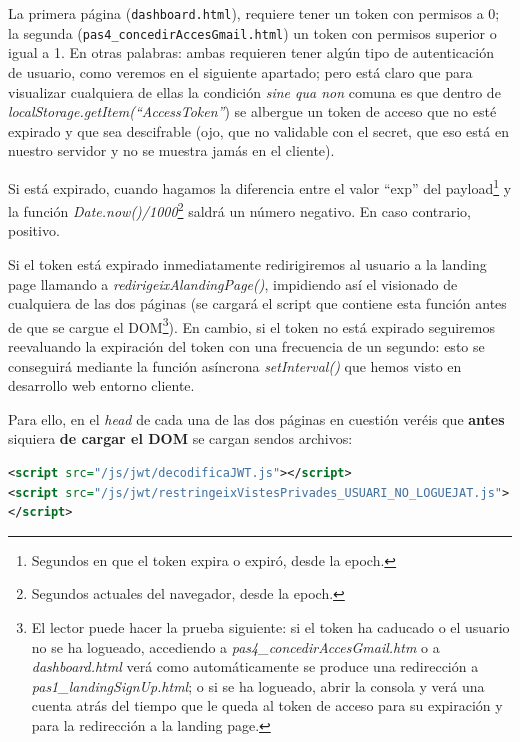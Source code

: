 \documentclass[a4paper,12pt]{report}
\begin{document}
	La primera página (\texttt{dashboard.html}), requiere tener un token con permisos a 0; la segunda (\texttt{pas4\_concedirAccesGmail.html}) un token con permisos superior o igual a 1. En otras palabras: ambas requieren tener algún tipo de autenticación de usuario, como veremos en el siguiente apartado; pero está claro que para visualizar cualquiera de ellas la condición \textit{sine qua non} comuna es que dentro de \textit{localStorage.getItem(``AccessToken''}) se albergue un token de acceso que no esté expirado y que sea descifrable (ojo, que no validable con el secret, que eso está en nuestro servidor y no se muestra jamás en el cliente).
	
	Si está expirado, cuando hagamos la diferencia entre el valor ``exp'' del payload\footnote{Segundos en que el token expira o expiró, desde la epoch.} y la función \textit{Date.now()/1000}\footnote{Segundos actuales del navegador, desde la epoch.} saldrá un número negativo. En caso contrario, positivo. 
	
	Si el token está expirado inmediatamente redirigiremos al usuario a la landing page llamando a \textit{redirigeixAlandingPage()}, impidiendo así el visionado de cualquiera de las dos páginas (se cargará el script que contiene esta función antes de que se cargue el DOM\footnote{El lector puede hacer la prueba siguiente: si el token ha caducado o el usuario no se ha logueado, accediendo a \textit{pas4\_concedirAccesGmail.htm} o a \textit{dashboard.html} verá como automáticamente se produce una redirección a \textit{pas1\_landingSignUp.html}; o si se ha logueado, abrir la consola y verá una cuenta atrás del tiempo que le queda al token de acceso para su expiración y para la redirección a la landing page.}). En cambio, si el token no está expirado seguiremos reevaluando la expiración del token con una frecuencia de un segundo: esto se conseguirá mediante la función asíncrona \textit{setInterval()} que hemos visto en desarrollo web entorno cliente.
	
	Para ello, en el \textit{head} de cada una de las dos páginas en cuestión veréis que \textbf{antes} siquiera \textbf{de cargar el DOM} se cargan sendos archivos:
	
\begin{lstlisting}[language=xml, basicstyle=\ttfamily\footnotesize, keywordstyle=\color{magenta}]
<script src="/js/jwt/decodificaJWT.js"></script>
<script src="/js/jwt/restringeixVistesPrivades_USUARI_NO_LOGUEJAT.js">
</script>
\end{lstlisting}
	
\end{document}
